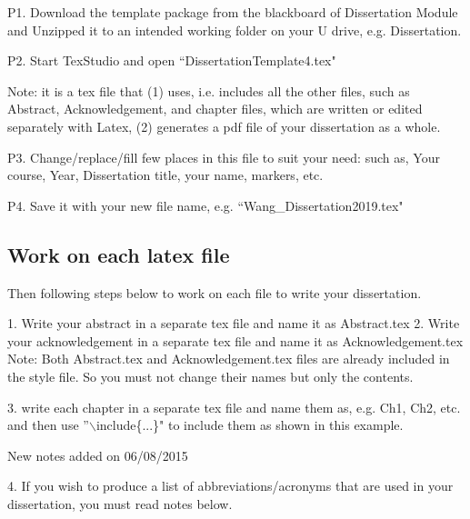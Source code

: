 P1. Download the template package from the blackboard of Dissertation Module and
Unzipped it to an intended working folder on your U drive, e.g. Dissertation.    

P2. Start TexStudio and open ``DissertationTemplate4.tex" 

Note: it is a tex file that (1) uses, i.e. includes all the other files, such as Abstract, Acknowledgement, and chapter files, which are written or edited separately with Latex, 
(2) generates a pdf file of your dissertation as a whole.         
 
P3. Change/replace/fill few places in this file to suit your need:
 		such as, Your course, Year, Dissertation title, your name, markers, etc.
 		
P4. Save it with your new file name, e.g. ``Wang\_Dissertation2019.tex" 


\subsection{Work on each latex file}
		
Then following steps below to work on each file to write your dissertation.    

 1. Write your abstract in a separate tex file and name it as Abstract.tex
 2. Write your acknowledgement in a separate tex file and name it as Acknowledgement.tex  
    Note: Both Abstract.tex and Acknowledgement.tex files are already included in the style file.
    So you must not change their names but only the contents.    

 3. write each chapter in a separate tex file and name them as, e.g. Ch1, Ch2, etc. 
 and then use ''$\backslash$include\{...\}" to include them as shown in this example.
 
New notes added on 06/08/2015

4. If you wish to produce a list of abbreviations/acronyms 
 that are used in your dissertation, you must read notes below. 

